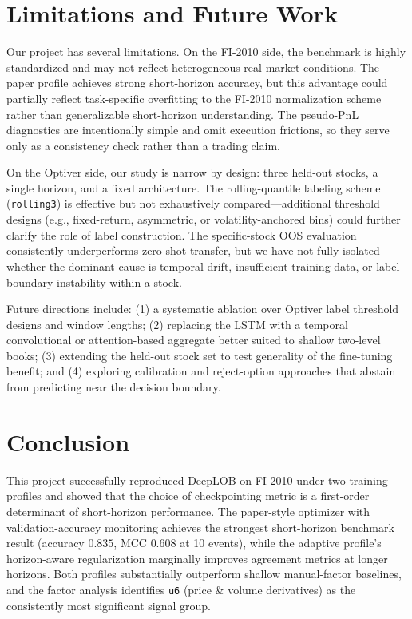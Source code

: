 \documentclass[11pt]{article}
\begin{document}
\section{Limitations and Future Work}
Our project has several limitations. On the FI-2010 side, the benchmark is highly standardized and may not reflect heterogeneous real-market conditions. The paper profile achieves strong short-horizon accuracy, but this advantage could partially reflect task-specific overfitting to the FI-2010 normalization scheme rather than generalizable short-horizon understanding. The pseudo-PnL diagnostics are intentionally simple and omit execution frictions, so they serve only as a consistency check rather than a trading claim.

On the Optiver side, our study is narrow by design: three held-out stocks, a single horizon, and a fixed architecture. The rolling-quantile labeling scheme (\texttt{rolling3}) is effective but not exhaustively compared---additional threshold designs (e.g., fixed-return, asymmetric, or volatility-anchored bins) could further clarify the role of label construction. The specific-stock OOS evaluation consistently underperforms zero-shot transfer, but we have not fully isolated whether the dominant cause is temporal drift, insufficient training data, or label-boundary instability within a stock.

Future directions include: (1) a systematic ablation over Optiver label threshold designs and window lengths; (2) replacing the LSTM with a temporal convolutional or attention-based aggregate better suited to shallow two-level books; (3) extending the held-out stock set to test generality of the fine-tuning benefit; and (4) exploring calibration and reject-option approaches that abstain from predicting near the decision boundary.

\section{Conclusion}
This project successfully reproduced DeepLOB on FI-2010 under two training profiles and showed that the choice of checkpointing metric is a first-order determinant of short-horizon performance. The paper-style optimizer with validation-accuracy monitoring achieves the strongest short-horizon benchmark result (accuracy $0.835$, MCC $0.608$ at 10 events), while the adaptive profile's horizon-aware regularization marginally improves agreement metrics at longer horizons. Both profiles substantially outperform shallow manual-factor baselines, and the factor analysis identifies \texttt{u6} (price \& volume derivatives) as the consistently most significant signal group.
\end{document}
